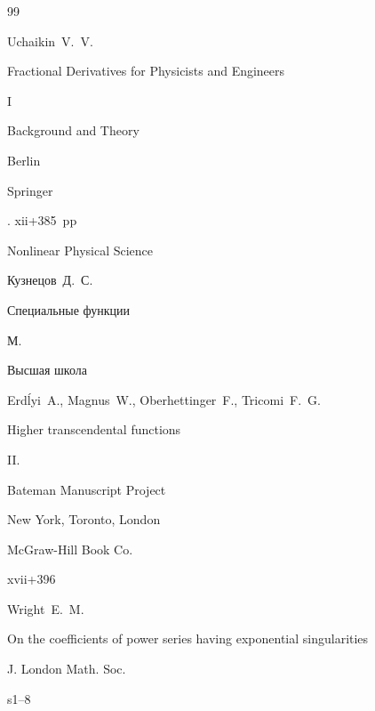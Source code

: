 \begin{thebibliography}{99}

\by Uchaikin~V.~V.

\book Fractional Derivatives for Physicists and Engineers

\vol I

\volinfo Background and Theory

\publaddr Berlin

\publ Springer

. xii+385~pp


\serial Nonlinear Physical Science









\by Кузнецов~Д.~С.

\book Специальные функции

\publaddr М.

\publ Высшая школа







\by Erd\'lyi~A., Magnus~W., Oberhettinger~F., Tricomi~F.~G.

\book Higher transcendental functions

\bookvol II. 

\serial Bateman Manuscript Project

\publaddr New York, Toronto, London

\publ McGraw-Hill Book Co.

\totalpages xvii+396 






\by Wright~E.~M.

\paper On the coefficients of power series having exponential singularities

\jour J. London Math. Soc.

\vol s1--8




\end{thebibliography}
